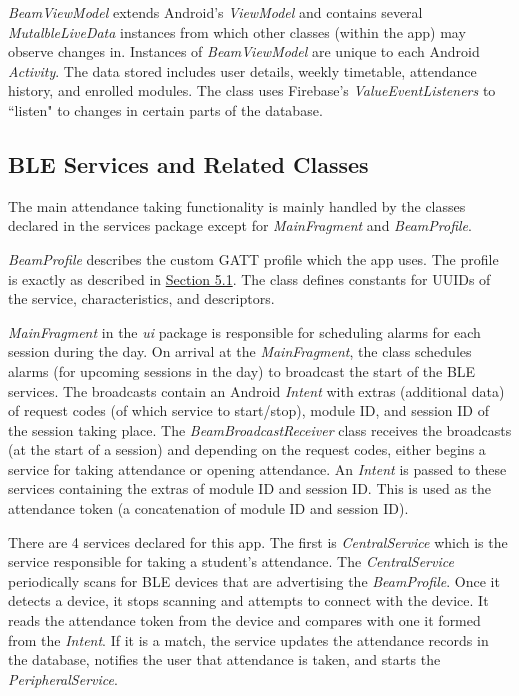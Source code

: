\documentclass[../report.tex]{subfiles}
\begin{document}
\textit{BeamViewModel} extends Android’s \textit{ViewModel} and contains several \textit{MutalbleLiveData} instances from which other classes (within the app) may observe changes in. Instances of \textit{BeamViewModel} are unique to each Android \textit{Activity}. The data stored includes user details, weekly timetable, attendance history, and enrolled modules. The class uses Firebase’s \textit{ValueEventListeners} to ``listen" to changes in certain parts of the database. 



\subsection{BLE Services and Related Classes}
The main attendance taking functionality is mainly handled by the classes declared in the services package except for \textit{MainFragment} and \textit{BeamProfile}.

\textit{BeamProfile} describes the custom GATT profile which the app uses. The profile is exactly as described in \hyperref[sec:gatt-profile]{Section 5.1}. The class defines constants for UUIDs of the service, characteristics, and descriptors.

\textit{MainFragment} in the \textit{ui} package is responsible for scheduling alarms for each session during the day. On arrival at the \textit{MainFragment}, the class schedules alarms (for upcoming sessions in the day) to broadcast the start of the BLE services. The broadcasts contain an Android \textit{Intent} with extras (additional data) of request codes (of which service to start/stop), module ID, and session ID of the session taking place. The \textit{BeamBroadcastReceiver} class receives the broadcasts (at the start of a session) and depending on the request codes, either begins a service for taking attendance or opening attendance. An \textit{Intent} is passed to these services containing the extras of module ID and session ID. This is used as the attendance token (a concatenation of module ID and session ID).



There are 4 services declared for this app. The first is \textit{CentralService} which is the service responsible for taking a student’s attendance. The \textit{CentralService} periodically scans for BLE devices that are advertising the \textit{BeamProfile}. Once it detects a device, it stops scanning and attempts to connect with the device. It reads the attendance token from the device and compares with one it formed from the \textit{Intent}. If it is a match, the service updates the attendance records in the database, notifies the user that attendance is taken, and starts the \textit{PeripheralService}.
\end{document}

